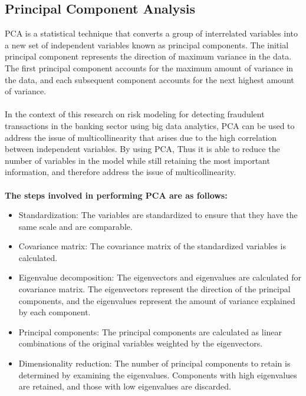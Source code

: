 \subsection{Principal Component Analysis}

PCA is a statistical technique that converts a group of interrelated variables into 
a new set of independent variables known as principal components. The initial principal component represents the 
direction of maximum variance in the data. The first principal component accounts for the maximum 
amount of variance in the data, and each subsequent component accounts for the next highest amount of variance.\\\\
In the context of this research on risk modeling for detecting fraudulent transactions in the banking sector 
using big data analytics, PCA can be used to address the issue of multicollinearity that arises due to the high 
correlation between independent variables. By using PCA, Thus it is able to reduce the number of variables in the 
model while still retaining the most important information, and therefore address the issue of multicollinearity.\\\\
\textbf{The steps involved in performing PCA are as follows:}
\begin{itemize}
\item Standardization: The variables are standardized to ensure that they have the same scale and are comparable.

\item Covariance matrix: The covariance matrix of the standardized variables is calculated.

\item Eigenvalue decomposition: The eigenvectors and eigenvalues are calculated for covariance matrix. 
The eigenvectors represent the direction of the principal components, and the eigenvalues represent the amount of 
variance explained by each component.

\item Principal components: The principal components are calculated as linear combinations of the original 
variables weighted by the eigenvectors.

\item Dimensionality reduction: The number of principal components to retain is determined by examining the 
eigenvalues. Components with high eigenvalues are retained, and those with low eigenvalues are discarded.\\
\end{itemize}
